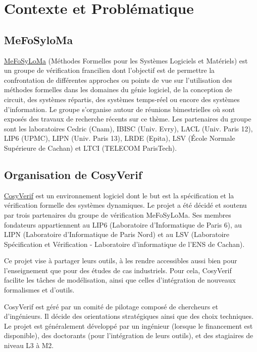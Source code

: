 \documentclass{report}
\begin{document}
\chapter{Contexte et Problématique}

\section{MeFoSyloMa}

\href{http://www.mefosyloma.fr/}{MeFoSyLoMa}
(Méthodes Formelles pour les Systèmes Logiciels et Matériels) est un groupe de vérification francilien dont
l'objectif est de permettre la confrontation de différentes approches ou points de vue sur l'utilisation des méthodes 
formelles dans les domaines du génie logiciel, de la conception de circuit, des systèmes répartis, des systèmes 
temps-réel ou encore des systèmes d'information. Le groupe s'organise autour de réunions bimestrielles où sont 
exposés des travaux de recherche récents sur ce thème. Les partenaires du groupe sont les laboratoires Cedric (Cnam), 
IBISC (Univ. Evry), LACL (Univ. Paris 12), LIP6 (UPMC), LIPN (Univ. Paris 13), LRDE (Epita), LSV (École Normale 
Supérieure de Cachan) et LTCI (TELECOM ParisTech).

\section{Organisation de CosyVerif}

\href{http://www.cosyverif.org}{CosyVerif} est un environnement logiciel dont le but est la spécification et la vérification
formelle des systèmes dynamiques. Le projet a été décidé et soutenu par
trois partenaires du groupe de vérification MeFoSyLoMa. Ses membres
fondateurs appartiennent au LIP6 (Laboratoire 
d'Informatique de Paris 6), au LIPN (Laboratoire d'Informatique de Paris
Nord) et au LSV (Laboratoire Spécification et 
Vérification - Laboratoire d'informatique de l'ENS de Cachan).

Ce projet vise à partager leurs outils, à les rendre accessibles aussi bien
pour l'enseignement que pour des études de cas industriels.
Pour cela, CosyVerif facilite les tâches de modélisation, ainsi que celles
d'intégration de nouveaux formalismes et d'outils.

CosyVerif est géré par un comité de pilotage composé de chercheurs et d'ingénieurs. Il décide des orientations 
stratégiques ainsi que des choix techniques.
Le projet est généralement développé par un ingénieur (lorsque le
financement est disponible), des doctorants (pour l'intégration de leurs
outils), et des stagiaires de niveau L3 à M2.
\end{document}
